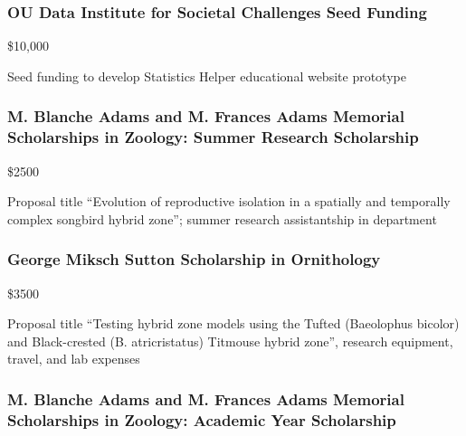 \documentclass[
  letterpaper,
  DIV=11,
  numbers=noendperiod,
  oneside]{scrreprt}
\begin{document}
\subsubsection{OU Data Institute for Societal Challenges Seed
Funding}\label{ou-data-institute-for-societal-challenges-seed-funding}

\$10,000


Seed funding to develop Statistics Helper educational website prototype

\subsubsection{M. Blanche Adams and M. Frances Adams Memorial
Scholarships in Zoology: Summer Research
Scholarship}\label{m.-blanche-adams-and-m.-frances-adams-memorial-scholarships-in-zoology-summer-research-scholarship}

\$2500


Proposal title ``Evolution of reproductive isolation in a spatially and
temporally complex songbird hybrid zone''; summer research assistantship
in department

\subsubsection{George Miksch Sutton Scholarship in
Ornithology}\label{george-miksch-sutton-scholarship-in-ornithology}

\$3500


Proposal title ``Testing hybrid zone models using the Tufted (Baeolophus
bicolor) and Black-crested (B. atricristatus) Titmouse hybrid zone'',
research equipment, travel, and lab expenses

\subsubsection{M. Blanche Adams and M. Frances Adams Memorial
Scholarships in Zoology: Academic Year
Scholarship}\label{m.-blanche-adams-and-m.-frances-adams-memorial-scholarships-in-zoology-academic-year-scholarship}
\end{document}
